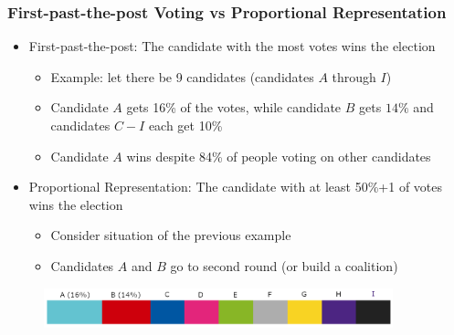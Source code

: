 \documentclass{beamer}
\begin{document}
\begin{frame}
\frametitle{First-past-the-post Voting vs Proportional Representation}
\begin{itemize}
\item First-past-the-post: The candidate with the most votes wins the election
\begin{itemize}
    \item Example: let there be 9 candidates (candidates $A$ through $I$)
    \item Candidate $A$ gets 16\% of the votes, while candidate $B$ gets $14\%$ and candidates $C-I$ each get 10\%
    \item Candidate $A$ wins despite 84\% of people voting on other candidates
\end{itemize}


\item Proportional Representation: The candidate with at least 50\%+1 of votes wins the election
\begin{itemize}
    \item Consider situation of the previous example
    \item Candidates $A$ and $B$ go to second round (or build a coalition)
\end{itemize}


\end{itemize}

\begin{figure}
    \centering
    \includegraphics[width=0.9\textwidth]{images/partiesExample.png}
\end{figure}

\end{frame}
\end{document}
